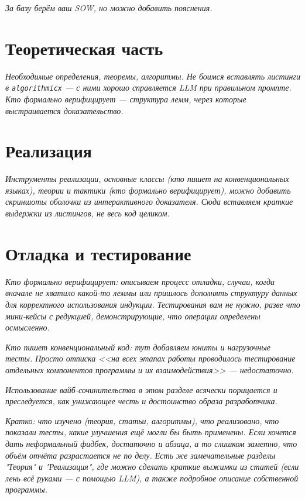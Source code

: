 \documentclass[14pt, russian]{scrartcl}
\begin{document}
\textit{За базу берём ваш SOW, но можно добавить пояснения.}

\newpage
\section{Теоретическая часть}

\textit{Необходимые определения, теоремы, алгоритмы. Не боимся вставлять листинги в \texttt{algorithmicx} --- с ними хорошо справляется LLM при правильном промпте. Кто формально верифицирует --- структура лемм, через которые выстраивается доказательство.}

\newpage
\section{Реализация}

\textit{Инструменты реализации, основные классы (кто пишет на конвенциональных языках), теории и тактики (кто формально верифицирует), можно добавить скриншоты оболочки из интерактивного доказателя. Сюда вставляем краткие выдержки из листингов, не весь код целиком.}

\newpage
\section{Отладка и тестирование}

\textit{Кто формально верифицирует: описываем процесс отладки, случаи, когда вначале не хватило какой-то леммы или пришлось дополнять структуру данных для корректного использования индукции. Тестирования вам не нужно, разве что мини-кейсы с редукцией, демонстрирующие, что операции определены осмысленно.}

\textit{Кто пишет конвенциональный код: тут добавляем юниты и нагрузочные тесты. Просто отписка <<на всех этапах работы проводилось тестирование отдельных компонентов программы и их взаимодействия>> --- недостаточно.}

\textit{Использование вайб-сочинительства в этом разделе всячески порицается и преследуется, как унижающее честь и достоинство образа разработчика.}

\newpage
{}
\textit{Кратко: что изучено (теория, статьи, алгоритмы), что реализовано, что показали тесты, какие улучшения ещё могли бы быть применены. Если хочется дать неформальный фидбек, достаточно и абзаца, а то слишком заметно, что объём отчёта разрастается не по делу. Есть же замечательные разделы "Теория"{} и "Реализация"{}, где можно сделать краткие выжимки из статей (если лень всё руками --- с помощью LLM), а также подробное описание собственной программы.}
\end{document}
